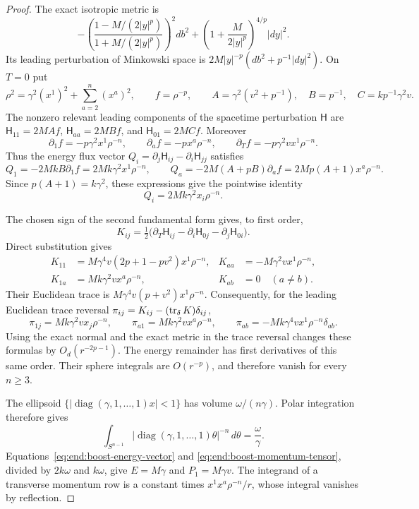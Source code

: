 \begin{proof}
The exact isotropic metric is
\[
 -\left(\frac{1-M/(2|y|^p)}{1+M/(2|y|^p)}\right)^2db^2
 +\left(1+\frac{M}{2|y|^p}\right)^{4/p}|dy|^2.
\]
Its leading perturbation of Minkowski space is
$2M|y|^{-p}(db^2+p^{-1}|dy|^2)$.  On $T=0$ put
\[
 \rho^2=\gamma^2(x^1)^2+\sum_{a=2}^n(x^a)^2,\qquad f=\rho^{-p},
 \qquad A=\gamma^2(v^2+p^{-1}),\quad B=p^{-1},\quad
 C=kp^{-1}\gamma^2v.
\]
The nonzero relevant leading components of the spacetime perturbation
$\mathsf H$ are
$\mathsf H_{11}=2MAf$, $\mathsf H_{aa}=2MBf$, and
$\mathsf H_{01}=2MCf$.  Moreover
\[
 \partial_1f=-p\gamma^2x^1\rho^{-n},\qquad
 \partial_af=-px^a\rho^{-n},\qquad
 \partial_Tf=-p\gamma^2vx^1\rho^{-n}.
\]
Thus the energy flux vector $Q_i=\partial_j\mathsf H_{ij}
-\partial_i\mathsf H_{jj}$ satisfies
\[
 Q_1=-2MkB\partial_1f=2Mk\gamma^2x^1\rho^{-n},\qquad
 Q_a=-2M(A+pB)\partial_af=2Mp(A+1)x^a\rho^{-n}.
\]
Since $p(A+1)=k\gamma^2$, these expressions give the pointwise identity
\begin{equation}\label{eq:end:boost-energy-vector}
 Q_i=2Mk\gamma^2x_i\rho^{-n}.
\end{equation}

The chosen sign of the second fundamental form gives, to first order,
\[
 K_{ij}=\tfrac12\bigl(\partial_T\mathsf H_{ij}
                 -\partial_i\mathsf H_{0j}
                 -\partial_j\mathsf H_{0i}\bigr).
\]
Direct substitution gives
\begin{align*}
 K_{11}&=M\gamma^4v(2p+1-pv^2)x^1\rho^{-n},&
 K_{aa}&=-M\gamma^2vx^1\rho^{-n},\\
 K_{1a}&=Mk\gamma^2vx^a\rho^{-n},&
 K_{ab}&=0\quad(a\ne b).
\end{align*}
Their Euclidean trace is
$M\gamma^4v(p+v^2)x^1\rho^{-n}$.  Consequently, for the leading
Euclidean trace reversal $\pi_{ij}=K_{ij}-(\operatorname{tr}_\delta K)\delta_{ij}$,
\begin{equation}\label{eq:end:boost-momentum-tensor}
 \pi_{1j}=Mk\gamma^2v x_j\rho^{-n},\qquad
 \pi_{a1}=Mk\gamma^2vx^a\rho^{-n},\qquad
 \pi_{ab}=-Mk\gamma^4vx^1\rho^{-n}\delta_{ab}.
\end{equation}
Using the exact normal and the exact metric in the trace reversal
changes these formulas by $O_d(r^{-2p-1})$.  The energy remainder
has first derivatives of this same order.  Their sphere integrals
are $O(r^{-p})$, and therefore vanish for every $n\ge3$.

The ellipsoid $\{|\operatorname{diag}(\gamma,1,\ldots,1)x|<1\}$
has volume $\omega/(n\gamma)$.  Polar integration therefore gives
\begin{equation}\label{eq:end:ellipsoid-integral}
 \int_{S^{n-1}}|\operatorname{diag}(\gamma,1,\ldots,1)\theta|^{-n}
 \,d\theta=\frac{\omega}{\gamma}.
\end{equation}
Equations~\eqref{eq:end:boost-energy-vector} and
\eqref{eq:end:boost-momentum-tensor}, divided by $2k\omega$ and
$k\omega$, give $E=M\gamma$ and $P_1=M\gamma v$.
The integrand of a transverse momentum row is a constant times
$x^1x^a\rho^{-n}/r$, whose integral vanishes by reflection.
\end{proof}

